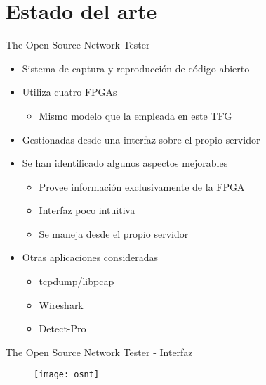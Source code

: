 \section{Estado del arte}

\begin{frame}{The Open Source Network Tester}
  \begin{itemize}
    \item\alert<+>{Sistema de captura y reproducción de código abierto}
    \item\alert<+>{Utiliza cuatro FPGAs}
    \begin{itemize}
      \item Mismo modelo que la empleada en este TFG
    \end{itemize}
    \item\alert<+>{Gestionadas desde una interfaz sobre el propio servidor}
    \item\alert<+>{Se han identificado algunos aspectos mejorables}
    \begin{itemize}
      \item Provee información exclusivamente de la FPGA
      \item Interfaz poco intuitiva
      \item Se maneja desde el propio servidor
    \end{itemize}
    \item\alert<+>{Otras aplicaciones consideradas}
    \begin{itemize}
      \item tcpdump/libpcap
      \item Wireshark
      \item Detect-Pro
    \end{itemize}
  \end{itemize}
\end{frame}

\begin{frame}{The Open Source Network Tester - Interfaz}
  \begin{figure}
    \texttt{[image: osnt]}
  \end{figure}
\end{frame}
